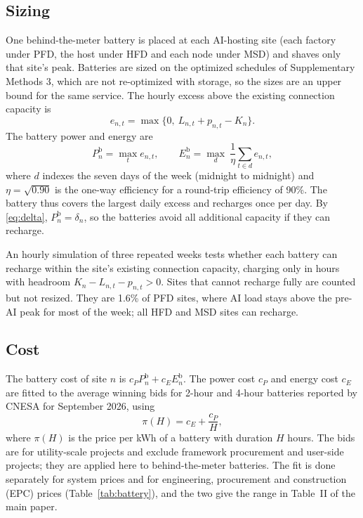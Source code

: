 \documentclass[11pt]{article}
\begin{document}
\subsection*{Sizing}
One behind-the-meter battery is placed at each AI-hosting site (each factory under PFD, the host under HFD and each node under MSD) and shaves only that site's peak. Batteries are sized on the optimized schedules of Supplementary Methods 3, which are not re-optimized with storage, so the sizes are an upper bound for the same service. The hourly excess above the existing connection capacity is
\begin{equation}
e_{n,t}=\max\{0,\ L_{n,t}+p_{n,t}-K_n\}.\label{eq:excess}
\end{equation}
The battery power and energy are
\begin{equation}
P^{\mathrm{b}}_n=\max_t e_{n,t},\qquad E^{\mathrm{b}}_n=\max_{d}\ \frac{1}{\eta}\sum_{t\in d}e_{n,t},\label{eq:battery}
\end{equation}
where $d$ indexes the seven days of the week (midnight to midnight) and $\eta=\sqrt{0.90}$ is the one-way efficiency for a round-trip efficiency of 90\%. The battery thus covers the largest daily excess and recharges once per day. By \eqref{eq:delta}, $P^{\mathrm{b}}_n=\delta_n$, so the batteries avoid all additional capacity if they can recharge.

An hourly simulation of three repeated weeks tests whether each battery can recharge within the site's existing connection capacity, charging only in hours with headroom $K_n-L_{n,t}-p_{n,t}>0$. Sites that cannot recharge fully are counted but not resized. They are 1.6\% of PFD sites, where AI load stays above the pre-AI peak for most of the week; all HFD and MSD sites can recharge.

\subsection*{Cost}
The battery cost of site $n$ is $c_PP^{\mathrm{b}}_n+c_EE^{\mathrm{b}}_n$. The power cost $c_P$ and energy cost $c_E$ are fitted to the average winning bids for 2-hour and 4-hour batteries reported by CNESA for September 2026, using
\begin{equation}
\pi(H)=c_E+\frac{c_P}{H},\label{eq:pricefit}
\end{equation}
where $\pi(H)$ is the price per kWh of a battery with duration $H$ hours. The bids are for utility-scale projects and exclude framework procurement and user-side projects; they are applied here to behind-the-meter batteries. The fit is done separately for system prices and for engineering, procurement and construction (EPC) prices (Table~\ref{tab:battery}), and the two give the range in Table~II of the main paper.
\end{document}

